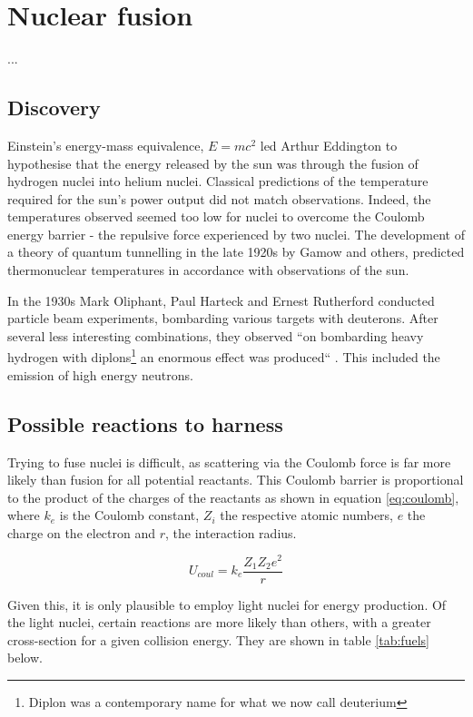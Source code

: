 
\section{Nuclear fusion}
...

\subsection{Discovery}
Einstein's energy-mass equivalence, $E=mc^{2}$ led Arthur Eddington to hypothesise that the energy released by the sun was through the fusion of hydrogen nuclei into helium nuclei. Classical predictions of the temperature required for the sun's power output did not match observations. Indeed, the temperatures observed seemed too low for nuclei to overcome the Coulomb energy barrier - the repulsive force experienced by two nuclei. The development of a theory of quantum tunnelling in the late 1920s by Gamow and others, predicted thermonuclear temperatures in accordance with observations of the sun. 

In the 1930s Mark Oliphant, Paul Harteck and Ernest Rutherford conducted particle beam experiments, bombarding various targets with deuterons. After several less interesting combinations, they observed ``on bombarding heavy hydrogen with diplons\footnote{Diplon was a contemporary name for what we now call deuterium} an enormous effect was produced`` \cite{}. This included the emission of high energy neutrons. %

\subsection{Possible reactions to harness}
Trying to fuse nuclei is difficult, as scattering via the Coulomb force is far more likely than fusion for all potential reactants. This Coulomb barrier is proportional to the product of the charges of the reactants as shown in equation \ref{eq:coulomb}, where $k_{e}$ is the Coulomb constant, $Z_{i}$ the respective atomic numbers, $e$ the charge on the electron and $r$, the interaction radius.

\begin{equation}
  \label{eq:coulomb}
  U_{coul} = k_{e}\frac{Z_{1}Z_{2}e^{2}}{r}
\end{equation}

Given this, it is only plausible to employ light nuclei for energy production. Of the light nuclei, certain reactions are more likely than others, with a greater cross-section for a given collision energy. They are shown in table \ref{tab:fuels} below.

